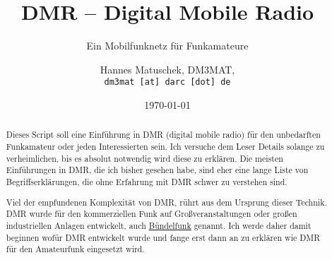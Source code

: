 \documentclass[11pt, a4paper,parskip=half]{scrartcl}
\title{DMR -- Digital Mobile Radio}
\subtitle{Ein Mobilfunknetz für Funkamateure}
\author{Hannes Matuschek, DM3MAT,\\\texttt{dm3mat [at] darc [dot] de}}
\date{\today}
\begin{document}
\begin{titlepage}
\maketitle
\vfill
\begin{abstract}
 Dieses Script soll eine Einführung in DMR (digital mobile radio) für den 
 unbedarften Funkamateur oder jeden Interessierten sein. Ich versuche dem 
 Leser Details solange zu verheimlichen, bis es absolut notwendig wird 
 diese zu erklären. Die meisten
 Einführungen in DMR, die ich bisher gesehen habe, sind eher eine lange Liste
 von Begriffserklärungen, die ohne Erfahrung mit DMR schwer zu verstehen sind. 
  
 Viel der empfundenen Komplexität von DMR, rührt aus dem Ursprung dieser 
 Technik. DMR wurde für den kommerziellen Funk auf Großveranstaltungen oder 
 großen industriellen Anlagen entwickelt, auch 
 \href{https://de.wikipedia.org/wiki/B\%C3\%BCndelfunk}{Bündelfunk} genannt. 
 Ich werde daher damit beginnen wofür DMR entwickelt wurde und fange erst dann
 an zu erklären wie DMR für den Amateurfunk eingesetzt wird.
\end{abstract}
\end{titlepage}
\pagebreak

\tableofcontents
\pagebreak









	













\appendix
\printindex
\end{document}
